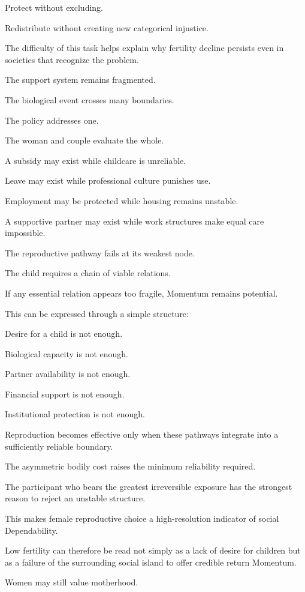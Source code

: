 Protect without excluding.

Redistribute without creating new categorical injustice.

The difficulty of this task helps explain why fertility decline persists even in societies that recognize the problem.

The support system remains fragmented.

The biological event crosses many boundaries.

The policy addresses one.

The woman and couple evaluate the whole.

A subsidy may exist while childcare is unreliable.

Leave may exist while professional culture punishes use.

Employment may be protected while housing remains unstable.

A supportive partner may exist while work structures make equal care impossible.

The reproductive pathway fails at its weakest node.

The child requires a chain of viable relations.

If any essential relation appears too fragile, Momentum remains potential.

This can be expressed through a simple structure:

Desire for a child is not enough.

Biological capacity is not enough.

Partner availability is not enough.

Financial support is not enough.

Institutional protection is not enough.

Reproduction becomes effective only when these pathways integrate into a sufficiently reliable boundary.

The asymmetric bodily cost raises the minimum reliability required.

The participant who bears the greatest irreversible exposure has the strongest reason to reject an unstable structure.

This makes female reproductive choice a high-resolution indicator of social Dependability.

Low fertility can therefore be read not simply as a lack of desire for children but as a failure of the surrounding social island to offer credible return Momentum.

Women may still value motherhood.

